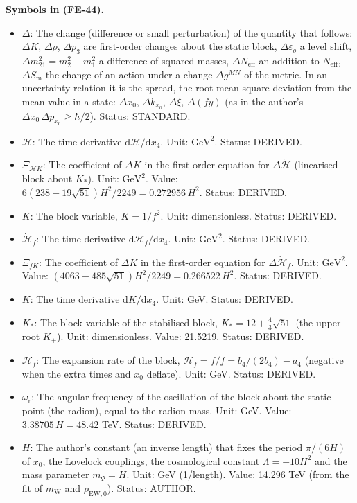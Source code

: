 \documentclass[
  10pt,
]{article}
\providecommand{\tightlist}{%
  \setlength{\itemsep}{0pt}\setlength{\parskip}{0pt}}
\begin{document}
\textbf{Symbols in (FE-44).}

\begin{itemize}
\tightlist
\item
  \(\Delta\): The change (difference or small perturbation) of the
  quantity that follows: \(\Delta K\), \(\Delta\rho\), \(\Delta p_3\)
  are first-order changes about the static block,
  \(\Delta\varepsilon_o\) a level shift,
  \(\Delta m^2_{21} = m_2^2 - m_1^2\) a difference of squared masses,
  \(\Delta N_{\mathrm{eff}}\) an addition to \(N_{\mathrm{eff}}\),
  \(\Delta S_{\mathrm{m}}\) the change of an action under a change
  \(\Delta g^{MN}\) of the metric. In an uncertainty relation it is the
  spread, the root-mean-square deviation from the mean value in a state:
  \(\Delta x_0\), \(\Delta k_{x_0}\), \(\Delta\xi\), \(\Delta(fy)\) (as
  in the author's \(\Delta x_0\,\Delta p_{x_0} \ge \hbar/2\)). Status:
  STANDARD.
\item
  \(\dot{\mathcal{H}}\): The time derivative
  \(\mathrm{d}\mathcal{H}/\mathrm{d}x_4\). Unit: \(\mathrm{GeV}^{2}\).
  Status: DERIVED.
\item
  \(\Xi_{\mathcal{H}K}\): The coefficient of \(\Delta K\) in the
  first-order equation for \(\Delta\dot{\mathcal{H}}\) (linearised block
  about \(K_*\)). Unit: \(\mathrm{GeV}^{2}\). Value:
  \(6(238 - 19\sqrt{51})H^2/2249 = 0.272956\,H^2\). Status: DERIVED.
\item
  \(K\): The block variable, \(K = 1/f^2\). Unit: dimensionless. Status:
  DERIVED.
\item
  \(\dot{\mathcal{H}}_f\): The time derivative
  \(\mathrm{d}\mathcal{H}_f/\mathrm{d}x_4\). Unit: \(\mathrm{GeV}^{2}\).
  Status: DERIVED.
\item
  \(\Xi_{fK}\): The coefficient of \(\Delta K\) in the first-order
  equation for \(\Delta\dot{\mathcal{H}}_f\). Unit:
  \(\mathrm{GeV}^{2}\). Value:
  \((4063 - 485\sqrt{51})H^2/2249 = 0.266522\,H^2\). Status: DERIVED.
\item
  \(\dot K\): The time derivative \(\mathrm{d}K/\mathrm{d}x_4\). Unit:
  GeV. Status: DERIVED.
\item
  \(K_*\): The block variable of the stabilised block,
  \(K_* = 12 + \frac43\sqrt{51}\) (the upper root \(K_+\)). Unit:
  dimensionless. Value: 21.5219. Status: DERIVED.
\item
  \(\mathcal{H}_f\): The expansion rate of the block,
  \(\mathcal{H}_f = \dot f/f = \dot b_4/(2b_4) - \dot a_4\) (negative
  when the extra times and \(x_0\) deflate). Unit: GeV. Status: DERIVED.
\item
  \(\omega_{\mathrm{r}}\): The angular frequency of the oscillation of
  the block about the static point (the radion), equal to the radion
  mass. Unit: GeV. Value: \(3.38705\,H = 48.42\) TeV. Status: DERIVED.
\item
  \(H\): The author's constant (an inverse length) that fixes the period
  \(\pi/(6H)\) of \(x_0\), the Lovelock couplings, the cosmological
  constant \(\Lambda = -10H^2\) and the mass parameter \(m_\Psi = H\).
  Unit: GeV (1/length). Value: 14.296 TeV (from the fit of
  \(m_{\mathrm{W}}\) and \(\rho_{\mathrm{EW},0}\)). Status: AUTHOR.
\end{itemize}
\end{document}
